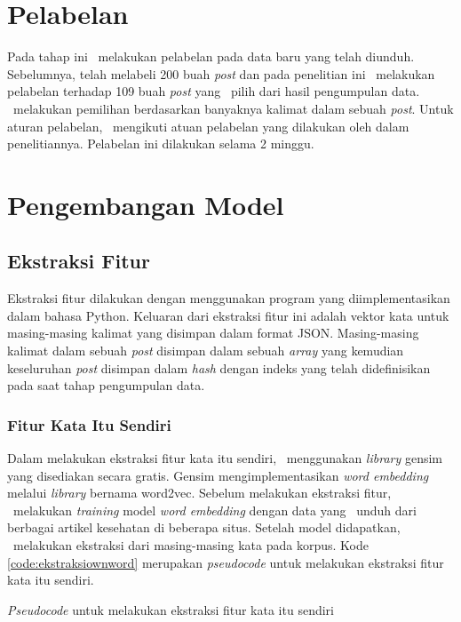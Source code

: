 \section{Pelabelan}
Pada tahap ini \saya~melakukan pelabelan pada data baru yang telah diunduh. Sebelumnya, \cite{skripsiKakRadit} telah melabeli 200 buah \textit{post} dan pada penelitian ini \saya~melakukan pelabelan terhadap 109 buah \textit{post} yang \saya~pilih dari hasil pengumpulan data. \Saya~melakukan pemilihan berdasarkan banyaknya kalimat dalam sebuah \textit{post}. Untuk aturan pelabelan, \saya~mengikuti atuan pelabelan yang dilakukan oleh \cite{skripsiKakRadit} dalam penelitiannya. Pelabelan ini dilakukan selama 2 minggu.

\section{Pengembangan Model}
\subsection{Ekstraksi Fitur}
Ekstraksi fitur dilakukan dengan menggunakan program yang diimplementasikan dalam bahasa Python. Keluaran dari ekstraksi fitur ini adalah vektor kata untuk masing-masing kalimat yang disimpan dalam format JSON. Masing-masing kalimat dalam sebuah \textit{post} disimpan dalam sebuah \textit{array} yang kemudian keseluruhan \textit{post} disimpan dalam \textit{hash} dengan indeks yang telah didefinisikan pada saat tahap pengumpulan data.

\subsubsection{Fitur Kata Itu Sendiri}
Dalam melakukan ekstraksi fitur kata itu sendiri, \saya~menggunakan \textit{library} gensim \citep{rehurek_lrec} yang disediakan secara gratis. Gensim mengimplementasikan \textit{word embedding} melalui \textit{library} bernama word2vec. Sebelum melakukan ekstraksi fitur, \saya~melakukan \textit{training} model \textit{word embedding} dengan data yang \saya~unduh dari berbagai artikel kesehatan di beberapa situs. Setelah model didapatkan, \saya~melakukan ekstraksi dari masing-masing kata pada korpus. Kode \ref{code:ekstraksiownword} merupakan \textit{pseudocode} untuk melakukan ekstraksi fitur kata itu sendiri.

\begin{kode}

	
	\caption{\textit{Pseudocode} untuk melakukan ekstraksi fitur kata itu sendiri}
	\label{code:ekstraksiownword}
\end{kode}

